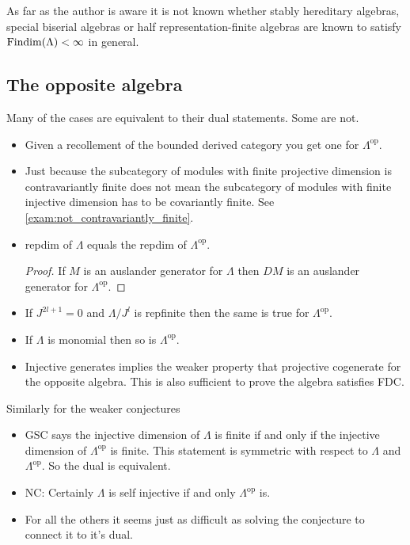 As far as the author is aware it is not known whether stably hereditary algebras, special biserial algebras or half representation-finite algebras are known to satisfy $\operatorname{Findim}(\Lambda) < \infty$ in general.

\subsection{The opposite algebra}

Many of the cases are equivalent to their dual statements. Some are not.
\begin{itemize}
	\item Given a recollement of the bounded derived category you get one for $\Lambda^{\operatorname{op}}$. 
	\item Just because the subcategory of modules with finite projective dimension is contravariantly finite does not mean the subcategory of modules with finite injective dimension has to be covariantly finite. See \cref{exam:not_contravariantly_finite}.
	\item repdim of $\Lambda$ equals the repdim of $\Lambda^{\operatorname{op}}$.
	\begin{proof}
		If $M$ is an auslander generator for $\Lambda$ then $DM$ is an auslander generator for $\Lambda^{\operatorname{op}}$.
	\end{proof}
	\item If $J^{2l+1} = 0$ and $\Lambda/J^l$ is repfinite then the same is true for $\Lambda^{\operatorname{op}}$.
	\item If $\Lambda$ is monomial then so is $\Lambda^{\operatorname{op}}$.
	\item Injective generates implies the weaker property that projective cogenerate for the opposite algebra. This is also sufficient to prove the algebra satisfies FDC.\cite[Section~5]{Rick19} 
\end{itemize}

Similarly for the weaker conjectures
\begin{itemize}
	\item GSC says the injective dimension of $\Lambda$ is finite if and only if the injective dimension of $\Lambda^{\operatorname{op}}$ is finite. This statement is symmetric with respect to $\Lambda$ and $\Lambda^{\operatorname{op}}$. So the dual is equivalent.
	\item NC: Certainly $\Lambda$ is self injective if and only $\Lambda^{\operatorname{op}}$ is. 
	\item For all the others it seems just as difficult as solving the conjecture to connect it to it's dual.
\end{itemize}
